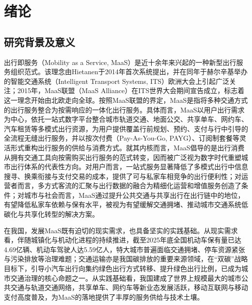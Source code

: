 \setlength{\baselineskip}{20pt}


\chapter{绪论}\label{chap.intro}

\section{研究背景及意义}\label{sec.intro.background}

出行即服务（Mobility as a Service, MaaS）是近十余年来兴起的一种新型出行服务组织范式。该理念由Hietanen于2014年首次系统提出\cite{hietanenMobilityService2014}，并在同年于赫尔辛基举办的智能交通系统（Intelligent Transport Systems, ITS）欧洲大会上引起广泛关注；2015年，MaaS联盟（MaaS Alliance）在ITS世界大会期间宣告成立，标志着这一理念开始由北欧走向全球。按照MaaS联盟的界定，MaaS是指将多种交通方式的出行服务整合为按需响应的一体化出行服务。具体而言，MaaS以用户出行需求为中心，依托一站式数字平台整合城市轨道交通、地面公交、共享单车、网约车、汽车租赁等多模式出行资源，为用户提供覆盖行前规划、预约、支付与行中引导的全流程无缝出行服务，并以按次付费（Pay-As-You-Go, PAYG）、订阅制套餐等灵活形式重构出行服务的供给与消费方式\cite{jittrapiromMobilityServiceCritical2017,kamargianniCriticalReviewNew2016}。就其内核而言，MaaS倡导的是出行消费从拥有交通工具向按需购买出行服务的范式转变，因而被广泛视为数字时代重塑城市出行体系的代表性方向。对用户而言，一站式服务显著降低了多模式出行中信息搜寻、换乘衔接与支付交易的成本，提供了可与私家车相竞争的出行便利性；对运营者而言，多方式客流的汇聚与出行数据的融合为精细化运营和增值服务创造了条件；对城市与社会而言，MaaS通过提升公共交通与共享出行在出行链中的地位，有望降低私家车依赖与保有水平，被视为有望缓解交通拥堵、推动城市交通系统低碳化与共享化转型的解决方案\cite{wongMobilityServiceMaaS2020,hensherFutureMobilityService2024}。

在我国，发展MaaS既有迫切的现实需求，也具备坚实的实践基础。从现实需求看，伴随城镇化与机动化进程的持续推进，截至2025年底全国机动车保有量已达4.69亿辆、机动车驾驶人达5.59亿人，特大城市普遍面临交通拥堵、停车资源紧张与污染排放等治理难题；交通运输亦是我国碳排放的重要来源领域，在``双碳''战略目标下，引导小汽车出行向集约绿色出行方式转移、提升绿色出行比例，已成为城市交通治理的核心命题之一。从实践基础看，我国建成了世界上规模最大的城市公共交通与轨道交通网络，共享单车、网约车等新业态发展活跃，移动互联网与移动支付高度普及，为MaaS的落地提供了丰厚的服务供给与技术土壤。

